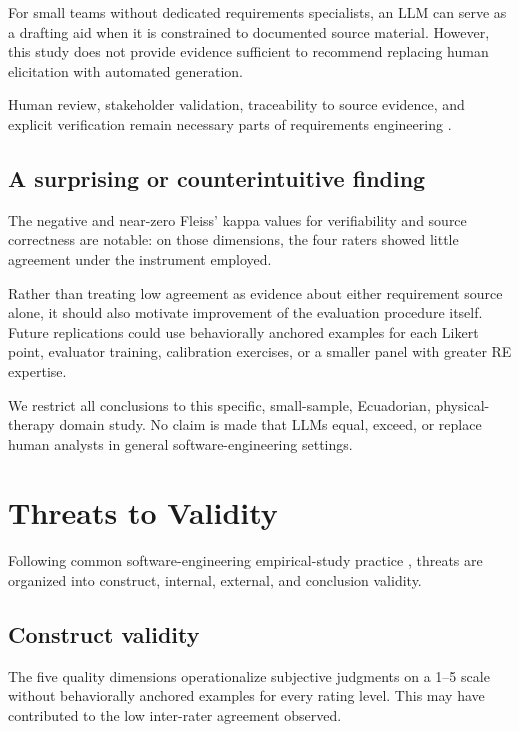 \documentclass[pdflatex,sn-basic]{sn-jnl}
\begin{document}
For small teams without dedicated requirements specialists, an LLM can serve as a drafting aid when it is constrained to documented source material. However, this study does not provide evidence sufficient to recommend replacing human elicitation with automated generation.

Human review, stakeholder validation, traceability to source evidence, and explicit verification remain necessary parts of requirements engineering \citep{pohl2010requirements,sommerville2016software,pressman2020software}.

\subsection{A surprising or counterintuitive finding}

The negative and near-zero Fleiss' kappa values for verifiability and source correctness are notable: on those dimensions, the four raters showed little agreement under the instrument employed.

Rather than treating low agreement as evidence about either requirement source alone, it should also motivate improvement of the evaluation procedure itself. Future replications could use behaviorally anchored examples for each Likert point, evaluator training, calibration exercises, or a smaller panel with greater RE expertise.

We restrict all conclusions to this specific, small-sample, Ecuadorian, physical-therapy domain study. No claim is made that LLMs equal, exceed, or replace human analysts in general software-engineering settings.

\section{Threats to Validity}

Following common software-engineering empirical-study practice \citep{runeson2009guidelines,wohlin2012experimentation}, threats are organized into construct, internal, external, and conclusion validity.

\subsection{Construct validity}

The five quality dimensions operationalize subjective judgments on a 1--5 scale without behaviorally anchored examples for every rating level. This may have contributed to the low inter-rater agreement observed.
\end{document}

